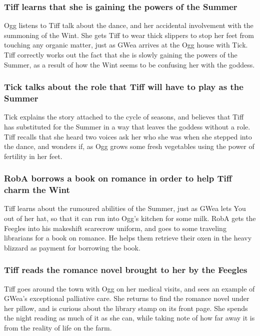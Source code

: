 \subsubsection{\Gls{Tiff} learns that she is gaining the powers of the \Gls{Summer}}
\Gls{Ogg} listens to \Gls{Tiff} talk about the dance, and her accidental involvement with the
summoning of the \Gls{Wint}. She gets \Gls{Tiff} to wear thick slippers to stop her feet from
touching any organic matter, just as \Gls{GWea} arrives at the Ogg house with \Gls{Tick}. \Gls{Tiff}
correctly works out the fact that she is slowly gaining the powers of the \Gls{Summer}, as a result
of how the \Gls{Wint} seems to be confusing her with the goddess.

\subsubsection{\Gls{Tick} talks about the role that \Gls{Tiff} will have to play as the
    \Gls{Summer}}
\Gls{Tick} explains the story attached to the cycle of seasons, and believes that \Gls{Tiff} has
substituted for the \Gls{Summer} in a way that leaves the goddess without a role. \Gls{Tiff} recalls
that she heard two voices ask her who she was when she stepped into the dance, and wonders if, as
\Gls{Ogg} grows some fresh vegetables using the power of fertility in her feet.

\subsubsection{\Gls{RobA} borrows a book on romance in order to help \Gls{Tiff} charm the
    \Gls{Wint}}
\Gls{Tiff} learns about the rumoured abilities of the \Gls{Summer}, just as \Gls{GWea} lets
\Gls{You} out of her hat, so that it can run into \Gls{Ogg}'s kitchen for some milk. \Gls{RobA}
gets the Feegles into his makeshift scarecrow uniform, and goes to some traveling librarians for a
book on romance. He helps them retrieve their oxen in the heavy blizzard as payment for borrowing
the book.

\subsubsection{\Gls{Tiff} reads the romance novel brought to her by the Feegles}
\Gls{Tiff} goes around the town with \Gls{Ogg} on her medical visits, and sees an example of
\Gls{GWea}'s exceptional palliative care. She returns to find the romance novel under her pillow,
and is curious about the library stamp on its front page. She spends the night reading as much of
it as she can, while taking note of how far away it is from the reality of life on the farm.

